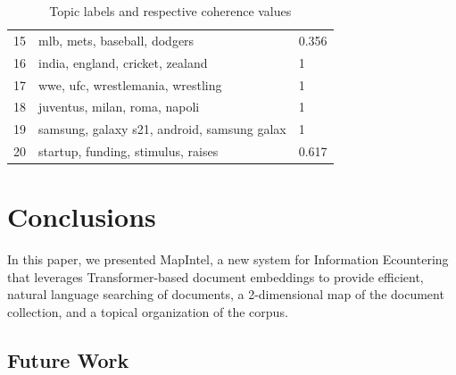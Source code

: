 \documentclass[a4paper]{article}
\begin{document}
\begin{table}[H]
{\begin{tabular}{@{}Sll@{}}
      15                          & mlb, mets, baseball, dodgers                  & 0.356                         \\
      16                          & india, england, cricket, zealand              & 1                             \\
      17                          & wwe, ufc, wrestlemania, wrestling             & 1                             \\
      18                          & juventus, milan, roma, napoli                 & 1                             \\
      19                          & samsung, galaxy s21, android, samsung galax   & 1                             \\
      20                          & startup, funding, stimulus, raises            & 0.617                         \\  \bottomrule
    \end{tabular}%
  }
  \caption{Topic labels and respective coherence values}
  \label{topic_labels}
\end{table}


\section{Conclusions}
In this paper, we presented MapIntel, a new system for Information Ecountering that leverages Transformer-based document embeddings to provide efficient, natural language searching of documents, a 2-dimensional map of the document collection, and a topical organization of the corpus.

\subsection{Future Work}
\end{document}
